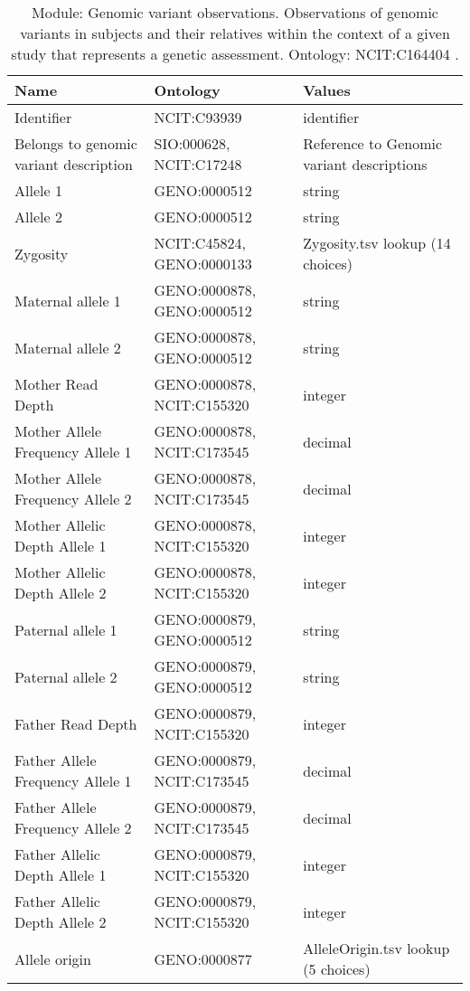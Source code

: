 \documentclass{article}
\begin{document}
\begin{table}[htb]
\begin{tabular}{lll}
Name & Ontology & Values \\
\hline
Identifier & NCIT:C93939  & identifier \\
Belongs to genomic variant description & SIO:000628, NCIT:C17248  & Reference to Genomic variant descriptions \\
Allele 1 & GENO:0000512  & string \\
Allele 2 & GENO:0000512  & string \\
Zygosity & NCIT:C45824, GENO:0000133  & Zygosity.tsv lookup (14 choices) \\
Maternal allele 1 & GENO:0000878, GENO:0000512  & string \\
Maternal allele 2 & GENO:0000878, GENO:0000512  & string \\
Mother Read Depth & GENO:0000878, NCIT:C155320  & integer \\
Mother Allele Frequency Allele 1 & GENO:0000878, NCIT:C173545  & decimal \\
Mother Allele Frequency Allele 2 & GENO:0000878, NCIT:C173545  & decimal \\
Mother Allelic Depth Allele 1 & GENO:0000878, NCIT:C155320  & integer \\
Mother Allelic Depth Allele 2 & GENO:0000878, NCIT:C155320  & integer \\
Paternal allele 1 & GENO:0000879, GENO:0000512  & string \\
Paternal allele 2 & GENO:0000879, GENO:0000512  & string \\
Father Read Depth & GENO:0000879, NCIT:C155320  & integer \\
Father Allele Frequency Allele 1 & GENO:0000879, NCIT:C173545  & decimal \\
Father Allele Frequency Allele 2 & GENO:0000879, NCIT:C173545  & decimal \\
Father Allelic Depth Allele 1 & GENO:0000879, NCIT:C155320  & integer \\
Father Allelic Depth Allele 2 & GENO:0000879, NCIT:C155320  & integer \\
Allele origin & GENO:0000877  & AlleleOrigin.tsv lookup (5 choices) \\
\hline
\end{tabular}
\caption[Module: Genomic variant observations]{\label{table:table21} Module: Genomic variant observations. Observations of genomic variants in subjects and their relatives within the context of a given study that represents a genetic assessment. Ontology: NCIT:C164404 . }
\end{table}
\end{document}
